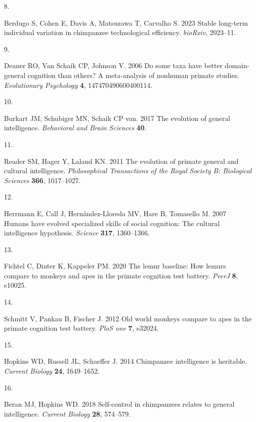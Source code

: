 \documentclass[
  man,floatsintext]{apa6}
\newlength{\cslhangindent}
\newlength{\csllabelwidth}
\newenvironment{CSLReferences}[2] %
 {\begin{list}{}{%
  \setlength{\itemindent}{0pt}
  \setlength{\leftmargin}{0pt}
  \setlength{\parsep}{0pt}
  \ifodd #1
   \setlength{\leftmargin}{\cslhangindent}
   \setlength{\itemindent}{-1\cslhangindent}
  \fi
  \setlength{\itemsep}{#2\baselineskip}}}
 {\end{list}}
\newcommand{\CSLLeftMargin}[1]{\parbox[t]{\csllabelwidth}{\strut#1\strut}}
\newcommand{\CSLRightInline}[1]{\parbox[t]{\linewidth - \csllabelwidth}{\strut#1\strut}}
\begin{document}
\begin{CSLReferences}{0}{1}
\CSLLeftMargin{8. }%
\CSLRightInline{Berdugo S, Cohen E, Davis A, Matsuzawa T, Carvalho S. 2023 Stable long-term individual variation in chimpanzee technological efficiency. \emph{bioRxiv}, 2023--11.}

\CSLLeftMargin{9. }%
\CSLRightInline{Deaner RO, Van Schaik CP, Johnson V. 2006 Do some taxa have better domain-general cognition than others? A meta-analysis of nonhuman primate studies. \emph{Evolutionary Psychology} \textbf{4}, 147470490600400114.}

\CSLLeftMargin{10. }%
\CSLRightInline{Burkart JM, Schubiger MN, Schaik CP van. 2017 The evolution of general intelligence. \emph{Behavioral and Brain Sciences} \textbf{40}.}

\CSLLeftMargin{11. }%
\CSLRightInline{Reader SM, Hager Y, Laland KN. 2011 The evolution of primate general and cultural intelligence. \emph{Philosophical Transactions of the Royal Society B: Biological Sciences} \textbf{366}, 1017--1027.}

\CSLLeftMargin{12. }%
\CSLRightInline{Herrmann E, Call J, Hernández-Lloreda MV, Hare B, Tomasello M. 2007 Humans have evolved specialized skills of social cognition: The cultural intelligence hypothesis. \emph{Science} \textbf{317}, 1360--1366.}

\CSLLeftMargin{13. }%
\CSLRightInline{Fichtel C, Dinter K, Kappeler PM. 2020 The lemur baseline: How lemurs compare to monkeys and apes in the primate cognition test battery. \emph{PeerJ} \textbf{8}, e10025.}

\CSLLeftMargin{14. }%
\CSLRightInline{Schmitt V, Pankau B, Fischer J. 2012 Old world monkeys compare to apes in the primate cognition test battery. \emph{PloS one} \textbf{7}, e32024.}

\CSLLeftMargin{15. }%
\CSLRightInline{Hopkins WD, Russell JL, Schaeffer J. 2014 Chimpanzee intelligence is heritable. \emph{Current Biology} \textbf{24}, 1649--1652.}

\CSLLeftMargin{16. }%
\CSLRightInline{Beran MJ, Hopkins WD. 2018 Self-control in chimpanzees relates to general intelligence. \emph{Current Biology} \textbf{28}, 574--579.}


\end{CSLReferences}
\end{document}
